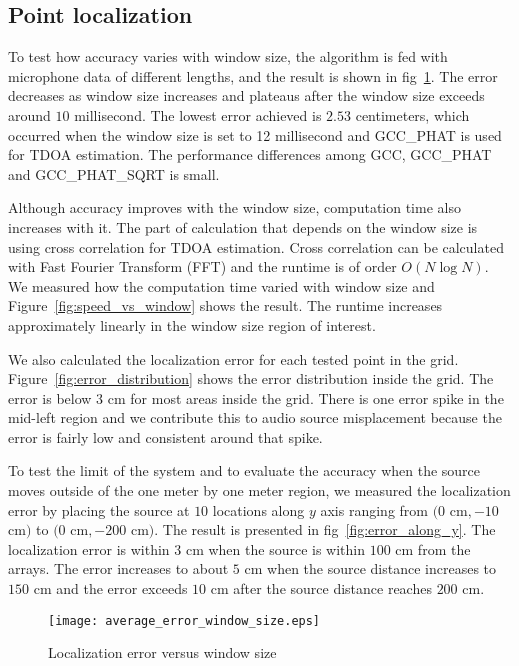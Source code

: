 \subsection{Point localization}
To test how accuracy varies with window size, the algorithm is fed with microphone data of different lengths, and the result is shown in fig~\ref{fig:accuracy_vs_window}. The error decreases as window size increases and plateaus after the window size exceeds around $10$ millisecond. The lowest error achieved is $2.53$ centimeters, which occurred when the window size is set to 12 millisecond and GCC\_PHAT is used for TDOA estimation. The performance differences among GCC, GCC\_PHAT and GCC\_PHAT\_SQRT is small.

Although accuracy improves with the window size, computation time also increases with it. The part of calculation that depends on the window size is using cross correlation for TDOA estimation. Cross correlation can be calculated with Fast Fourier Transform (FFT) and the runtime is of order $O(N\log N)$. We measured how the computation time varied with window size and Figure~\ref{fig:speed_vs_window} shows the result. The runtime increases approximately linearly in the window size region of interest.

We also calculated the localization error for each tested point in the grid. Figure~\ref{fig:error_distribution} shows the error distribution inside the grid. The error is below $3$ cm for most areas inside the grid. There is one error spike in the mid-left region and we contribute this to audio source misplacement because the error is fairly low and consistent around that spike.

To test the limit of the system and to evaluate the accuracy when the source moves outside of the one meter by one meter region, we measured the localization error by placing the source at $10$ locations along $y$ axis ranging from $(0$ cm$, -10$ cm$)$ to $(0$ cm$, -200$ cm$)$. The result is presented in fig~\ref{fig:error_along_y}. The localization error is within $3$ cm when the source is within $100$ cm from the arrays. The error increases to about $5$ cm when the source distance increases to $150$ cm and the error exceeds $10$ cm after the source distance reaches $200$ cm.

\begin{figure}[]
\centering
\texttt{[image: average\_error\_window\_size.eps]}
\caption{Localization error versus window size}
\label{fig:accuracy_vs_window}
\end{figure}

